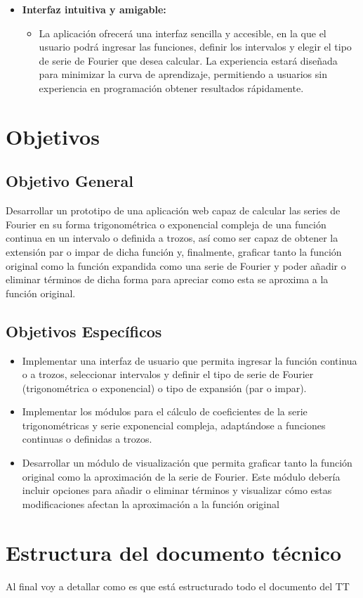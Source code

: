 \begin{itemize}
	\item \textbf{Interfaz intuitiva y amigable:}
	\vspace{-10pt}
	\begin{itemize}
		\item  La aplicación ofrecerá una interfaz sencilla y accesible, en la que el usuario podrá ingresar las funciones, definir los intervalos y elegir el tipo de serie de Fourier que desea calcular. La experiencia estará diseñada para minimizar la curva de aprendizaje, permitiendo a usuarios sin experiencia en programación obtener resultados rápidamente.
	\end{itemize}
\end{itemize}

\section{Objetivos}
\subsection{Objetivo General}
Desarrollar un prototipo de una aplicación web capaz de calcular las series de Fourier en su forma trigonométrica o exponencial compleja de una función continua en un intervalo o definida a trozos, así como ser capaz de obtener la extensión par o impar de dicha función y, finalmente, graficar tanto la función original como la función expandida como una serie de Fourier y poder añadir o eliminar términos de dicha forma para apreciar como esta se aproxima a la función original.

\subsection{Objetivos Específicos}
\begin{itemize}
	\item Implementar una interfaz de usuario que permita ingresar la función continua o a trozos, seleccionar intervalos y definir el tipo de serie de Fourier (trigonométrica o exponencial) o tipo de expansión (par o impar).
	\item Implementar los módulos para el cálculo de coeficientes de la serie trigonométricas y serie exponencial compleja, adaptándose a funciones continuas o definidas a trozos.
	\item  Desarrollar un módulo de visualización que permita graficar tanto la función original como la
	aproximación de la serie de Fourier. Este módulo debería incluir opciones para añadir o eliminar términos y visualizar cómo estas modificaciones afectan la aproximación a la función original
\end{itemize}

\section{Estructura del documento técnico}
Al final voy a detallar como es que está estructurado todo el documento del TT

